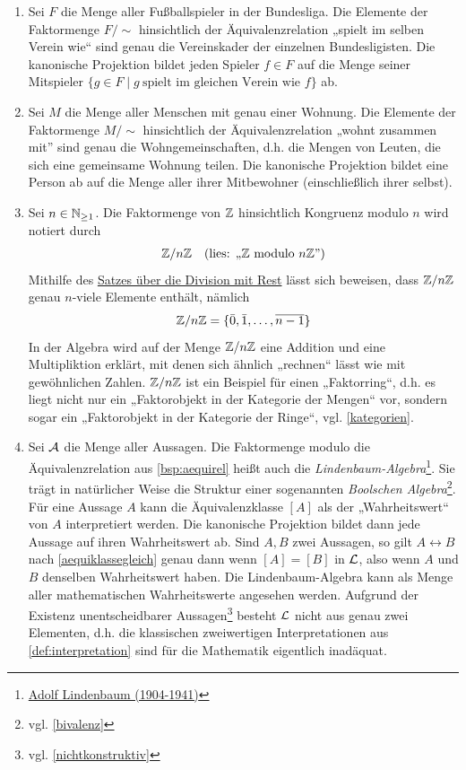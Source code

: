 \begin{bsp} \label{bsp:faktormenge} \quad
    \begin{enumerate}
        \item Sei $F$ die Menge aller Fußballspieler in der Bundesliga. Die Elemente der Faktormenge $F/{\sim}$ hinsichtlich der Äquivalenzrelation „spielt im selben Verein wie“ sind genau die Vereinskader der einzelnen Bundesligisten. Die kanonische Projektion bildet jeden Spieler $f\in F$ auf die Menge seiner Mitspieler $\{g\in F\mid g\ \text{spielt im gleichen Verein wie $f$}\}$ ab.
        \item Sei $M$ die Menge aller Menschen mit genau einer Wohnung. Die Elemente der Faktormenge $M/{\sim}$ hinsichtlich der Äquivalenzrelation „wohnt zusammen mit” sind genau die Wohngemeinschaften, d.h. die Mengen von Leuten, die sich eine gemeinsame Wohnung teilen. Die kanonische Projektion bildet eine Person ab auf die Menge aller ihrer Mitbewohner (einschließlich ihrer selbst).
        \item Sei $n\in \mathbb N_{\ge 1}$. Die Faktormenge von $\mathbb Z$ hinsichtlich Kongruenz modulo $n$ wird notiert durch
        \begin{align*}
            \mathbb Z/n\mathbb Z && (\text{lies: „$\mathbb Z$ modulo $n\mathbb Z$”})
        \end{align*}
        Mithilfe des \href{https://de.wikipedia.org/wiki/Division_mit_Rest}{Satzes über die Division mit Rest} lässt sich beweisen, dass $\mathbb Z/n\mathbb Z$ genau $n$-viele Elemente enthält, nämlich
        \[ \mathbb Z/n\mathbb Z = \{\bar 0,\bar 1,\dots , \overline{n-1} \} \]
        In der Algebra wird auf der Menge $\mathbb Z/n\mathbb Z$ eine Addition und eine Multipliktion erklärt, mit denen sich ähnlich „rechnen“ lässt wie mit gewöhnlichen Zahlen. $\mathbb Z/n\mathbb Z$ ist ein Beispiel für einen „Faktorring“, d.h. es liegt nicht nur ein „Faktorobjekt in der Kategorie der Mengen“ vor, sondern sogar ein „Faktorobjekt in der Kategorie der Ringe“, vgl. \cref{kategorien}.
        \item Sei $\mathcal A$ die Menge aller Aussagen. Die Faktormenge modulo die Äquivalenzrelation aus \cref{bsp:aequirel} heißt auch die \emph{Lindenbaum-Algebra}\footnote{\href{https://de.wikipedia.org/wiki/Adolf_Lindenbaum}{Adolf Lindenbaum (1904-1941)}}. Sie trägt in natürlicher Weise die Struktur einer sogenannten \emph{Boolschen Algebra}\footnote{vgl. \cref{bivalenz}}. Für eine Aussage $A$ kann die Äquivalenzklasse $[A]$ als der „Wahrheitswert“ von $A$ interpretiert werden. Die kanonische Projektion bildet dann jede Aussage auf ihren Wahrheitswert ab. Sind $A,B$ zwei Aussagen, so gilt $A\leftrightarrow B$ nach \cref{aequiklassegleich} genau dann wenn $[A]=[B]$ in $\mathcal L$, also wenn $A$ und $B$ denselben Wahrheitswert haben. Die Lindenbaum-Algebra kann als Menge aller mathematischen Wahrheitswerte angesehen werden. Aufgrund der Existenz unentscheidbarer Aussagen\footnote{vgl. \cref{nichtkonstruktiv}} besteht $\mathcal L$ nicht aus genau zwei Elementen, d.h. die klassischen zweiwertigen Interpretationen aus \cref{def:interpretation} sind für die Mathematik eigentlich inadäquat.
    \end{enumerate}
\end{bsp}


